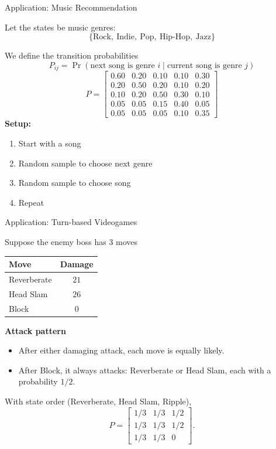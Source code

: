 \documentclass[10pt]{beamer}
\begin{document}

\begin{frame}{Application: Music Recommendation}

Let the states be music genres:
\[
\{\text{Rock},\ \text{Indie},\ \text{Pop},\ \text{Hip-Hop},\ \text{Jazz}\}
\]

\vspace{2mm}
We define the transition probabilities
\[
P_{ij} = \Pr(\text{next song is genre } i \mid \text{current song is genre } j)
\]
\[
P =
\begin{bmatrix}
0.60 & 0.20 & 0.10 & 0.10 & 0.30 \\
0.20 & 0.50 & 0.20 & 0.10 & 0.20 \\
0.10 & 0.20 & 0.50 & 0.30 & 0.10 \\
0.05 & 0.05 & 0.15 & 0.40 & 0.05 \\
0.05 & 0.05 & 0.05 & 0.10 & 0.35
\end{bmatrix}
\]
\textbf{Setup:}
\begin{enumerate}
    \item Start with a song
    \item Random sample to choose next genre 
    \item Random sample to choose song 
    \item Repeat
\end{enumerate}

\end{frame}

\begin{frame}{Application: Turn-based Videogames}

Suppose the enemy boss has 3 moves 
\begin{center}
\begin{tabular}{lc}
\textbf{Move} & \textbf{Damage}\\ \hline
Reverberate & $21$\\
Head Slam  & $26$\\
Block     & $0$
\end{tabular}
\end{center}

\textbf{Attack pattern}
\begin{itemize}
    \item After either damaging attack, each move is equally likely.
    \item After Block, it always attacks:
    Reverberate or Head Slam, each with a probability $1/2$.
\end{itemize}

With state order (Reverberate, Head Slam, Ripple),
\[
P =
\begin{bmatrix}
1/3 & 1/3 & 1/2\\
1/3 & 1/3 & 1/2\\
1/3 & 1/3 & 0
\end{bmatrix}.
\]


\end{frame}
\end{document}

